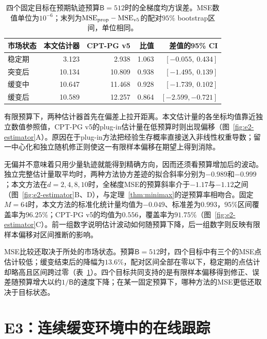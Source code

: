 \begin{table}[!htbp]
\centering
\small
\caption{四个固定目标在预期轨迹预算$\mathsf B=512$时的全梯度均方误差。MSE数值单位为$10^{-6}$；末列为$\mathrm{MSE}_{\rm prop}-\mathrm{MSE}_{\rm v5}$的配对$95\%$ bootstrap区间，单位相同。}
\label{tab:e2-period-mse}
\begin{tabular}{lrrrr}
\toprule
市场状态 & 本文估计器 & CPT-PG v5 & 比值 & 差值的95\% CI \\
\midrule
稳定期 & 3.123 & 2.938 & 1.063 & $[-0.055,\ 0.434]$ \\
突变后 & 10.134 & 10.809 & 0.938 & $[-1.495,\ 0.139]$ \\
缓变中 & 10.647 & 11.468 & 0.928 & $[-1.739,\ 0.102]$ \\
缓变后 & 10.589 & 12.257 & 0.864 & $[-2.599,-0.721]$ \\
\bottomrule
\end{tabular}
\end{table}

有限预算下，两种估计器首先在偏差上拉开距离。本文估计量的各坐标均值靠近独立数值参照值，CPT-PG v5的plug-in估计量在低预算时则出现偏移（图~\ref{fig:e2-estimator}A）。原因在于plug-in方法把经验生存概率直接送入非线性权重导数；留一中心化和独立随机修正则使这一有限样本偏移在期望上得到消除。

无偏并不意味着只用少量轨迹就能得到精确方向，因而还须看预算增加后的波动。独立完整估计量取平均时，两种方法协方差迹的拟合斜率分别为$-0.989$和$-0.999$；本文方法在$d=2,4,8,10$时，全梯度MSE的预算斜率介于$-1.17$与$-1.12$之间（图~\ref{fig:e2-estimator}B、D），与定理~\ref{thm:minimax}的逆预算率相吻合。固定$M=64$时，本文方法的标准化统计量均值为$-0.049$、标准差为$0.993$，$95\%$区间覆盖率为$96.25\%$；CPT-PG v5的均值为$0.556$，覆盖率为$91.75\%$（图~\ref{fig:e2-estimator}C）。前一组数字说明估计波动如何随预算下降，后一组数字则反映有限样本偏移对区间推断的影响。

MSE比较还取决于所处的市场状态。预算$\mathsf B=512$时，四个目标中有三个的MSE点估计较低；缓变结束后的降幅为$13.6\%$，配对区间全部在零以下，稳定期的点估计却略高且区间跨过零（表~\ref{tab:e2-period-mse}）。四个目标共同支持的是有限样本偏移得到修正、误差随预算增大以约$1/\mathsf B$的速度下降；在某一固定预算下，哪种方法的MSE更低还取决于目标状态。

\FloatBarrier
\section{E3：连续缓变环境中的在线跟踪}\label{sec:e3}

